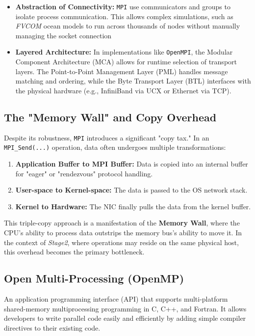 \documentclass[
	a4paper,
	10pt,
	unnumberedsections,
	twoside, 
]{LTJournalArticle}
\begin{document}
\begin{itemize}
	\item \textbf{Abstraction of Connectivity:} \texttt{MPI} use communicators and groups to isolate process communication. This allows complex simulations, such as \textit{FVCOM} ocean models to run across thousands of nodes without manually managing the socket connection
	
	\item \textbf{Layered Architecture:} In implementations like \texttt{OpenMPI}, the Modular Component Architecture (MCA) allows for runtime selection of transport layers. The Point-to-Point Management Layer (PML) handles message matching and ordering, while the Byte Transport Layer (BTL) interfaces with the physical hardware (e.g., InfiniBand via UCX or Ethernet via TCP).
\end{itemize}

\subsection{The "Memory Wall" and Copy Overhead}
Despite its robustness, \texttt{MPI} introduces a significant "copy tax." In an \texttt{MPI\_Send(...)} operation, data often undergoes multiple transformations:

\begin{enumerate}
	\item \textbf{Application Buffer to MPI Buffer:} Data is copied into an internal buffer for "eager" or "rendezvous" protocol handling.
	\item \textbf{User-space to Kernel-space:} The data is passed to the OS network stack.
	\item \textbf{Kernel to Hardware:} The NIC finally pulls the data from the kernel buffer.
\end{enumerate}

This triple-copy approach is a manifestation of the \textbf{Memory Wall}, where the CPU's ability to process data outstrips the memory bus's ability to move it. In the context of \textit{Stage2}, where operations may reside on the same physical host, this overhead becomes the primary bottleneck.

\subsection{Open Multi-Processing (OpenMP)}
\label{sec:OpenMP}
An application programming interface (API) that supports multi-platform shared-memory multiprocessing programming in C, C++, and Fortran. 
It allows developers to write parallel code easily and efficiently by adding simple compiler directives to their existing code.
\end{document}
